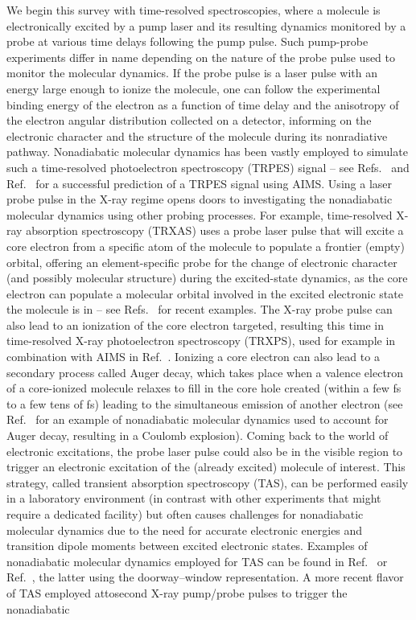 \documentclass[9pt,bestpractices,pubversion]{livecoms}
\begin{document}
We begin this survey with time-resolved spectroscopies, where a molecule is electronically excited by a pump laser and its resulting dynamics monitored by a probe at various time delays following the pump pulse. Such pump-probe experiments differ in name depending on the nature of the probe pulse used to monitor the molecular dynamics. If the probe pulse is a laser pulse with an energy large enough to ionize the molecule, one can follow the experimental binding energy of the electron as a function of time delay and the anisotropy of the electron angular distribution collected on a detector, informing on the electronic character and the structure of the molecule during its nonradiative pathway.\cite{schuurman2018reviewCI} Nonadiabatic molecular dynamics has been vastly employed to simulate such a time-resolved photoelectron spectroscopy (TRPES) signal -- see Refs.~ and Ref.~ for a successful prediction of a TRPES signal using AIMS. Using a laser probe pulse in the X-ray regime opens doors to investigating the nonadiabatic molecular dynamics using other probing processes. For example, time-resolved X-ray absorption spectroscopy (TRXAS) uses a probe laser pulse that will excite a core electron from a specific atom of the molecule to populate a frontier (empty) orbital, offering an element-specific probe for the change of electronic character (and possibly molecular structure) during the excited-state dynamics, as the core electron can populate a molecular orbital involved in the excited electronic state the molecule is in -- see Refs.~ for recent examples. The X-ray probe pulse can also lead to an ionization of the core electron targeted, resulting this time in time-resolved X-ray photoelectron spectroscopy (TRXPS), used for example in combination with AIMS in Ref.~. Ionizing a core electron can also lead to a secondary process called Auger decay, which takes place when a valence electron of a core-ionized molecule relaxes to fill in the core hole created (within a few fs to a few tens of fs) leading to the simultaneous emission of another electron (see Ref.~ for an example of nonadiabatic molecular dynamics used to account for Auger decay, resulting in a Coulomb explosion). Coming back to the world of electronic excitations, the probe laser pulse could also be in the visible region to trigger an electronic excitation of the (already excited) molecule of interest. This strategy, called transient absorption spectroscopy (TAS), can be performed easily in a laboratory environment (in contrast with other experiments that might require a dedicated facility) but often causes challenges for nonadiabatic molecular dynamics due to the need for accurate electronic energies and transition dipole moments between excited electronic states. Examples of nonadiabatic molecular dynamics employed for TAS can be found in Ref.~ or Ref.~, the latter using the doorway–window representation.\cite{yan1989doorwaywindow,yan1990pumpprobe} A more recent flavor of TAS employed attosecond X-ray pump/probe pulses to trigger the nonadiabatic 
\end{document}

